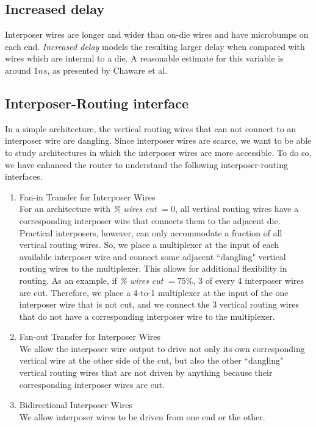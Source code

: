 \documentclass{sig-alternate-2013}
\begin{document}
\subsection{Increased delay}
Interposer wires are longer and wider than on-die wires and have microbumps on each end. \textit{Increased delay} models the resulting larger delay when compared with wires which are internal to a die. A reasonable estimate for this variable is around $1ns$, as presented by Chaware et al\cite{xilinxTSV}.

\subsection{Interposer-Routing interface}
In a simple architecture, the vertical routing wires that can not connect to an interposer wire are dangling. Since interposer wires are scarce, we want to be able to study architectures in which the interposer wires are more accessible. To do so, we have enhanced the router to understand the following interposer-routing interfaces.

\begin{enumerate}[label=(\alph*)]
\item Fan-in Transfer for Interposer Wires\\
For an architecture with \textit{\% wires cut} $=0$, all vertical routing wires have a corresponding interposer wire that connects them to the adjacent die. Practical interposers, however, can only accommodate a fraction of all vertical routing wires. So, we place a multiplexer at the input of each available interposer wire and connect some adjacent ``dangling" vertical routing wires to the multiplexer. This allows for additional flexibility in routing. As an example, if \textit{\% wires cut} $=75\%$, 3 of every 4 interposer wires are cut. Therefore, we place a 4-to-1 multiplexer at the input of the one interposer wire that is not cut, and we connect the 3 vertical routing wires that do not have a corresponding interposer wire to the multiplexer.

\item Fan-out Transfer for Interposer Wires\\
We allow the interposer wire output to drive not only its own corresponding vertical wire at the other side of the cut, but also the other ``dangling" vertical routing wires that are not driven by anything because their corresponding interposer wires are cut.

\item Bidirectional Interposer Wires\\
We allow interposer wires to be driven from one end or the other.
\end{enumerate}
\end{document}
